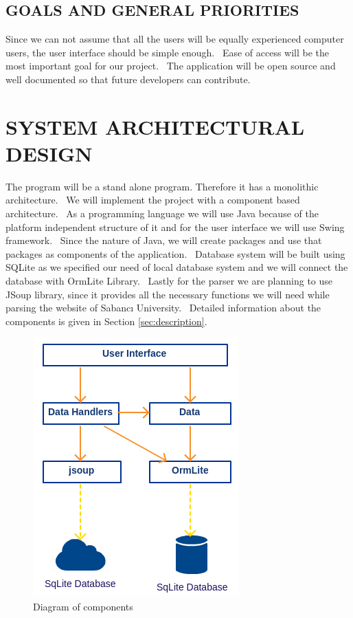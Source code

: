 \documentclass[twoside,letterpaper]{article}
\begin{document}
\subsection{GOALS AND GENERAL PRIORITIES}
Since we can not assume that all the users will be equally experienced computer users, the user interface should be simple enough. \ Ease of access will be the most important goal for our project. \ The application will be open source and well documented so that future developers can contribute. 


\clearpage\pagestyle{Standard}
\section{SYSTEM ARCHITECTURAL DESIGN}
\label{sec:architecture}


The program will be a stand alone program. Therefore it has a monolithic architecture. \ We will implement the project with a component based architecture. \  As a programming language we will use Java because of the platform independent structure of it and for the user interface we will use Swing framework. \ Since the nature of Java, we will create packages and use that packages as components of the application. \ Database system will be built using SQLite as we specified our need of local database system and we will connect the database with OrmLite Library. \ Lastly for the parser we are planning to use JSoup library, since it provides all the necessary functions we will need while parsing the website of Sabanc\i{} University. \ Detailed information about the components is given in Section \ref{sec:description}.

\begin{figure}[h]
\centering
\includegraphics[scale=0.9]{architecture.png}
\caption{Diagram of components}
\end{figure}
\end{document}
